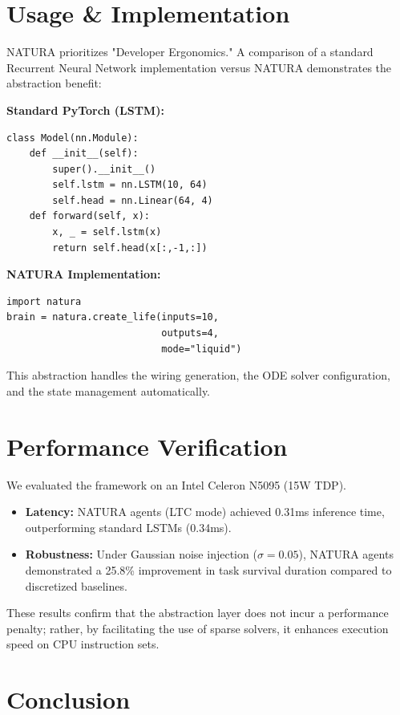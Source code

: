 \documentclass[journal]{IEEEtran}
\begin{document}
\section{Usage \& Implementation}

NATURA prioritizes "Developer Ergonomics." A comparison of a standard Recurrent Neural Network implementation versus NATURA demonstrates the abstraction benefit:

\textbf{Standard PyTorch (LSTM):}
\begin{verbatim}
class Model(nn.Module):
    def __init__(self):
        super().__init__()
        self.lstm = nn.LSTM(10, 64)
        self.head = nn.Linear(64, 4)
    def forward(self, x):
        x, _ = self.lstm(x)
        return self.head(x[:,-1,:])
\end{verbatim}

\textbf{NATURA Implementation:}
\begin{verbatim}
import natura
brain = natura.create_life(inputs=10, 
                           outputs=4, 
                           mode="liquid")
\end{verbatim}

This abstraction handles the wiring generation, the ODE solver configuration, and the state management automatically.


\section{Performance Verification}

We evaluated the framework on an Intel Celeron N5095 (15W TDP). 
\begin{itemize}
    \item \textbf{Latency:} NATURA agents (LTC mode) achieved 0.31ms inference time, outperforming standard LSTMs (0.34ms).
    \item \textbf{Robustness:} Under Gaussian noise injection ($\sigma=0.05$), NATURA agents demonstrated a 25.8\% improvement in task survival duration compared to discretized baselines.
\end{itemize}
These results confirm that the abstraction layer does not incur a performance penalty; rather, by facilitating the use of sparse solvers, it enhances execution speed on CPU instruction sets.


\section{Conclusion}
\end{document}
